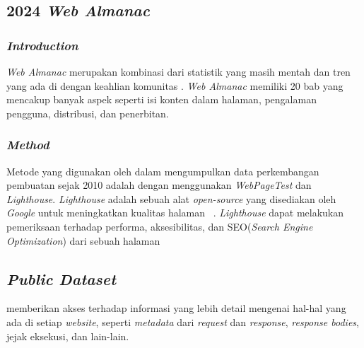 \subsection{2024 \textit{Web Almanac}}
\label{subsec:almanac}
\subsubsection{\textit{Introduction}}
\textit{Web Almanac} merupakan kombinasi dari statistik yang masih mentah dan tren yang ada di \http dengan keahlian komunitas \web. \textit{Web Almanac} memiliki 20 bab yang mencakup banyak aspek seperti isi konten dalam halaman, pengalaman pengguna, distribusi, dan penerbitan.

\subsubsection{\textit{Method}}
Metode yang digunakan oleh \http dalam mengumpulkan data perkembangan pembuatan \web sejak 2010 adalah dengan menggunakan \textit{WebPageTest} dan \textit{Lighthouse}. \textit{Lighthouse} adalah sebuah alat \textit{open-source} yang disediakan oleh \textit{Google} untuk meningkatkan kualitas halaman \web~\cite{lighthouse}. \textit{Lighthouse} dapat melakukan pemeriksaan terhadap performa, aksesibilitas, dan SEO(\textit{Search Engine Optimization}) dari sebuah halaman \web

\subsection{\textit{Public Dataset}}
\label{subsec:pd}
\http memberikan akses terhadap informasi yang lebih detail mengenai hal-hal yang ada di setiap \textit{website}, seperti \textit{metadata} dari \textit{request} dan \textit{response}, \textit{response bodies}, jejak eksekusi, dan lain-lain.



